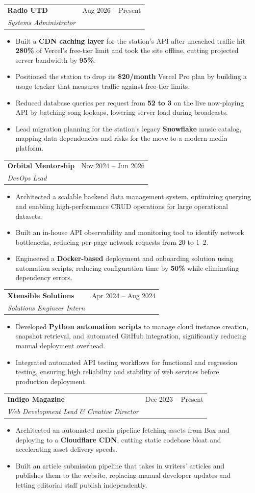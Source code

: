 \documentclass[letterpaper,11pt]{article}
\makeatletter
\newcommand{\resumeItem}[1]{\item\small{{#1 \vspace{-2pt}}}}
\newcommand{\resumeSubheading}[4]{
  \vspace{-2pt}\item
    \begin{tabular*}{0.97\textwidth}[t]{l@{\extracolsep{\fill}}r}
      \textbf{#1} & #2 \\
      \textit{\small#3} & \textit{\small #4} \\
    \end{tabular*}\vspace{-7pt}
}
\newcommand{\resumeItemListStart}{\begin{itemize}}
\newcommand{\resumeItemListEnd}{\end{itemize}\vspace{-5pt}}
\makeatother
\begin{document}
    \resumeSubheading
      {Radio UTD}{Aug 2026 -- Present}
      {Systems Administrator}{}
      \resumeItemListStart
        \resumeItem{Built a \textbf{CDN caching layer} for the station's API after uncached traffic hit \textbf{280\%} of Vercel's free-tier limit and took the site offline, cutting projected server bandwidth by \textbf{95\%}.}
        \resumeItem{Positioned the station to drop its \textbf{\$20/month} Vercel Pro plan by building a usage tracker that measures traffic against free-tier limits.}
        \resumeItem{Reduced database queries per request from \textbf{52 to 3} on the live now-playing API by batching song lookups, lowering server load during broadcasts.}
        \resumeItem{Lead migration planning for the station's legacy \textbf{Snowflake} music catalog, mapping data dependencies and risks for the move to a modern media platform.}
      \resumeItemListEnd

    \resumeSubheading
      {Orbital Mentorship}{Nov 2024 -- Jun 2026}
      {DevOps Lead}{}
      \resumeItemListStart
        \resumeItem{Architected a scalable backend data management system, optimizing querying and enabling high-performance CRUD operations for large operational datasets.}
        \resumeItem{Built an in-house API observability and monitoring tool to identify network bottlenecks, reducing per-page network requests from 20 to 1--2.}
        \resumeItem{Engineered a \textbf{Docker-based} deployment and onboarding solution using automation scripts, reducing configuration time by \textbf{50\%} while eliminating dependency errors.}
      \resumeItemListEnd

    \resumeSubheading
      {Xtensible Solutions}{Apr 2024 -- Aug 2024}
      {Solutions Engineer Intern}{}
      \resumeItemListStart
        \resumeItem{Developed \textbf{Python automation scripts} to manage cloud instance creation, snapshot retrieval, and automated GitHub integration, significantly reducing manual deployment overhead.}
        \resumeItem{Integrated automated API testing workflows for functional and regression testing, ensuring high reliability and stability of web services before production deployment.}
      \resumeItemListEnd

    \resumeSubheading
      {Indigo Magazine}{Dec 2023 -- Present}
      {Web Development Lead \& Creative Director}{}
      \resumeItemListStart
        \resumeItem{Architected an automated media pipeline fetching assets from Box and deploying to a \textbf{Cloudflare CDN}, cutting static codebase bloat and accelerating asset delivery speeds.}
        \resumeItem{Built an article submission pipeline that takes in writers' articles and publishes them to the website, replacing manual developer updates and letting editorial staff publish independently.}
      \resumeItemListEnd
\end{document}
